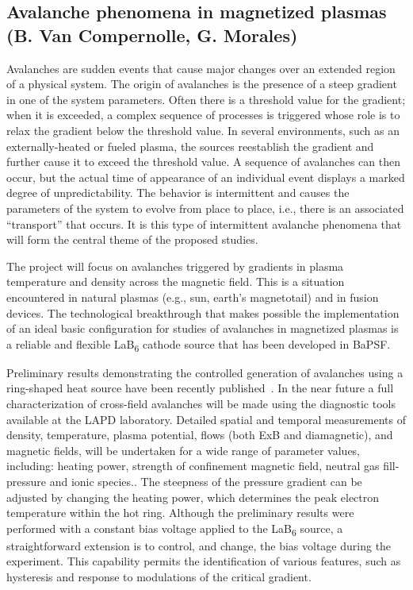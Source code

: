 \documentclass[11pt]{article}
\renewcommand{\cite}{\citep}
\begin{document}
\subsection{Avalanche phenomena in magnetized plasmas (B. Van Compernolle, G.
Morales)}

Avalanches are sudden events that cause major changes over an extended
region of a physical system. The origin of avalanches is the presence of
a steep gradient in one of the system parameters. Often there is a
threshold value for the gradient; when it is exceeded, a complex
sequence of processes is triggered whose role is to relax the gradient
below the threshold value. In several environments, such as an
externally-heated or fueled plasma, the sources reestablish the gradient
and further cause it to exceed the threshold value. A sequence of
avalanches can then occur, but the actual time of appearance of an
individual event displays a marked degree of unpredictability. The
behavior is intermittent and causes the parameters of the system to
evolve from place to place, i.e., there is an associated ``transport''
that occurs. It is this type of intermittent avalanche phenomena that
will form the central theme of the proposed studies.

The project will focus on avalanches triggered by gradients in plasma
temperature and density across the magnetic field. This is a situation
encountered in natural plasmas (e.g., sun, earth's magnetotail) and in
fusion devices. The technological breakthrough that makes possible the
implementation of an ideal basic configuration for studies of avalanches
in magnetized plasmas is a reliable and flexible LaB\textsubscript{6}
cathode source that has been developed in BaPSF.

Preliminary results demonstrating the controlled generation of
avalanches using a ring-shaped heat source have been recently
published~\cite{vancompernolle:2015b}. In the near future a full
characterization of cross-field avalanches will be made using the
diagnostic tools available at the LAPD laboratory. Detailed spatial
and temporal measurements of density, temperature, plasma potential,
flows (both ExB and diamagnetic), and magnetic fields, will be
undertaken for a wide range of parameter values, including: heating
power, strength of confinement magnetic field, neutral gas
fill-pressure and ionic species.. The steepness of the pressure
gradient can be adjusted by changing the heating power, which
determines the peak electron temperature within the hot ring. Although
the preliminary results were performed with a constant bias voltage
applied to the LaB\textsubscript{6} source, a straightforward
extension is to control, and change, the bias voltage during the
experiment. This capability permits the identification of various
features, such as hysteresis and response to modulations of the
critical gradient.
\end{document}
